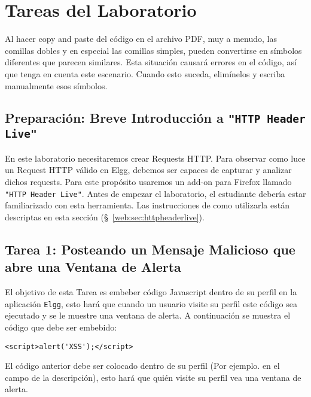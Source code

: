 \section{Tareas del Laboratorio}

Al hacer copy and paste del código en el archivo PDF, muy a menudo, las comillas dobles y en especial las comillas simples, pueden convertirse en símbolos diferentes que parecen similares. Esta situación causará errores en el código, así que tenga en cuenta este escenario. Cuando esto suceda, elimínelos y escriba manualmente esos símbolos.


\subsection{Preparación: Breve Introducción a \texttt{"HTTP Header Live"}}

En este laboratorio necesitaremos crear Requests HTTP. 
Para observar como luce un Request HTTP válido en Elgg, debemos ser capaces de capturar y analizar dichos requests.
Para este propósito usaremos un add-on para Firefox llamado \texttt{"HTTP Header Live"}. Antes de empezar el laboratorio, el estudiante debería estar familiarizado con esta herramienta.
Las instrucciones de como utilizarla están descriptas en esta sección (\S~\ref{web:sec:httpheaderlive}).



\subsection{Tarea 1: Posteando un Mensaje Malicioso que abre una Ventana de Alerta}

El objetivo de esta Tarea es embeber código Javascript dentro de su perfil en la aplicación {\tt Elgg}, esto hará que cuando un usuario visite su perfil este código sea ejecutado y se le muestre una ventana de alerta. 
A continuación se muestra el código que debe ser embebido:

\begin{lstlisting}
<script>alert('XSS');</script> 
\end{lstlisting}
El código anterior debe ser colocado dentro de su perfil (Por ejemplo. en el campo de la descripción), esto hará que quién visite su perfil vea una ventana de alerta.


